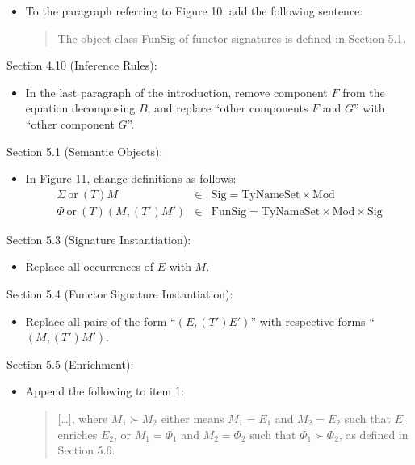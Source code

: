 \documentclass[twoside,titlepage]{article}
\newcommand{\void}[1]{}
\begin{document}
\begin{appendix}
\begin{itemize}
\item To the paragraph referring to Figure 10, add the following sentence:
  \begin{quote}
  The object class FunSig of functor signatures is defined in Section 5.1.
  \end{quote}
\end{itemize}

Section 4.10 (Inference Rules):
\begin{itemize}
\item In the last paragraph of the introduction, remove component $F$ from the equation decomposing $B$, and replace ``other components $F$ and $G$'' with ``other component $G$''.
\end{itemize}

Section 5.1 (Semantic Objects):
\begin{itemize}
\item In Figure 11, change definitions as follows:
  \begin{eqnarray*}
  \Sigma~\mbox{or}~(T)M &\in& \mbox{Sig} = \mbox{TyNameSet} \times \mbox{Mod} \\
  \Phi~\mbox{or}~(T)(M,(T')M') &\in& \mbox{FunSig} = \mbox{TyNameSet} \times \mbox{Mod} \times \mbox{Sig}
  \end{eqnarray*}
\end{itemize}

Section 5.3 (Signature Instantiation):
\begin{itemize}
\item Replace all occurrences of $E$ with $M$.
\void{
\item Replace with:
  \begin{quote}
  A module $M_2$ \emph{is a $\varphi$-instance} of a signature $\Sigma_1 = (T_1)M_1$, written $\Sigma_1 \geq_\varphi M_2$, if $\varphi(M_1) = M_2$ and $\mbox{Supp}\;\varphi \subseteq T_1$. A module $M_2$ \emph{is an instance} of a signature $\Sigma_1 = (T_1)M_1$, written $\Sigma_1 \geq M_2$, if there exists a realisation $\varphi$ such that $\Sigma_1 \geq_\varphi M_2$.
  \end{quote}
}
\end{itemize}

Section 5.4 (Functor Signature Instantiation):
\begin{itemize}
\item Replace all pairs of the form ``$(E,(T')E')$'' with respective forms ``$(M,(T')M')$.
\end{itemize}

Section 5.5 (Enrichment):
\begin{itemize}
\item Append the following to item 1:
  \begin{quote}
  [\dots], where $M_1 \succ M_2$ either means $M_1 = E_1$ and $M_2 = E_2$ such that $E_1$ enriches $E_2$, or $M_1 = \Phi_1$ and $M_2 = \Phi_2$ such that $\Phi_1 \succ \Phi_2$, as defined in Section 5.6.
  \end{quote}
\end{itemize}


\end{appendix}
\end{document}
